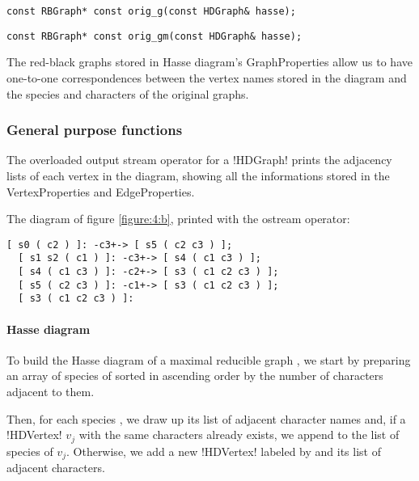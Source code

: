 \begin{lstlisting}[belowskip=0pt, moreemph={RBGraph, HDGraph},
                   moreemph={[2]orig_g}]
  const RBGraph* const orig_g(const HDGraph& hasse);
\end{lstlisting}

\begin{lstlisting}[aboveskip=\smallskipamount, moreemph={RBGraph, HDGraph},
                   moreemph={[2]orig_gm}]
  const RBGraph* const orig_gm(const HDGraph& hasse);
\end{lstlisting}

The red-black graphs stored in Hasse diagram's GraphProperties allow us to have one-to-one correspondences between the vertex names stored in the diagram and the species and characters of the original graphs.

\subsubsection*{General purpose functions}

The overloaded output stream operator for a !HDGraph! prints the adjacency lists of each vertex in the diagram, showing all the informations stored in the VertexProperties and EdgeProperties.

The diagram of figure \ref{figure:4:b}, printed with the ostream operator:

\begin{lstlisting}[belowskip=0pt, keywordstyle=\color{block_fg}]
  [ s0 ( c2 ) ]: -c3+-> [ s5 ( c2 c3 ) ];
  [ s1 s2 ( c1 ) ]: -c3+-> [ s4 ( c1 c3 ) ];
  [ s4 ( c1 c3 ) ]: -c2+-> [ s3 ( c1 c2 c3 ) ];
  [ s5 ( c2 c3 ) ]: -c1+-> [ s3 ( c1 c2 c3 ) ];
  [ s3 ( c1 c2 c3 ) ]:
\end{lstlisting}

\paragraph{Hasse diagram}

To build the Hasse diagram of a maximal reducible graph \gm{}, we start by preparing an array of species of \gm{} sorted in ascending order by the number of characters adjacent to them.

Then, for each species \species[i], we draw up its list of adjacent character names and, if a !HDVertex! $v_{j}$ with the same characters already exists, we append \species[i] to the list of species of $v_{j}$.
Otherwise, we add a new !HDVertex! labeled by \species[i] and its list of adjacent characters.

